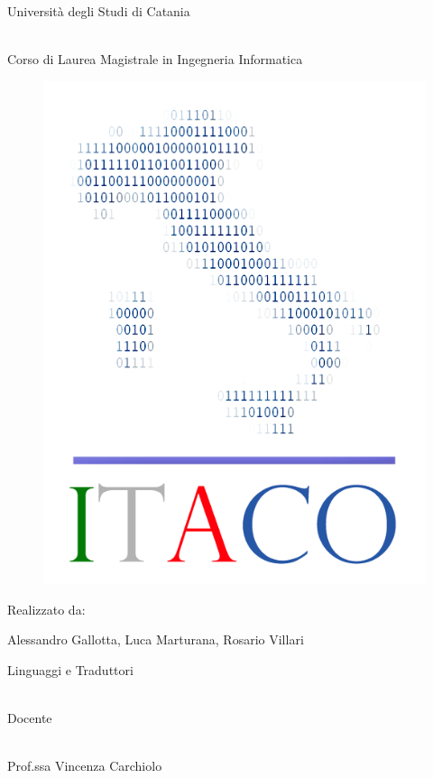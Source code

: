 \documentclass[11pt, a4paper, twoside, notitlepage]{report}
\begin{document}
\begin{center}
\begin{Large}
Università degli Studi di Catania
\end{Large}
\begin{large}
\\Corso di Laurea Magistrale in Ingegneria Informatica
\end{large}
\vspace{30pt}

\begin{figure}[h] \hspace*{130pt}
\includegraphics[scale=0.35]{img/itaco_logo2.png}
\end{figure}
\vspace{30pt}
Realizzato da:
\begin{Large}
Alessandro Gallotta, Luca Marturana, Rosario Villari
\end{Large}
\vspace{30pt}

\begin{large}
Linguaggi e Traduttori
\end{large}
\\Docente
\begin{Large}
\\Prof.ssa Vincenza Carchiolo
\end{Large}

\vspace{20pt}
\vfill
\end{center}
\end{document}

